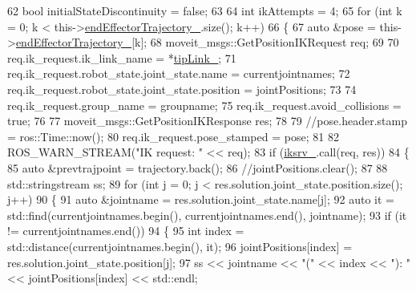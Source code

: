 \begin{DoxyCode}
62         \textcolor{keywordtype}{bool} initialStateDiscontinuity = \textcolor{keyword}{false};
63 
64         \textcolor{keywordtype}{int} ikAttempts = 4;
65         \textcolor{keywordflow}{for} (\textcolor{keywordtype}{int} k = 0; k < this->\hyperlink{classcl__move__group__interface_1_1CbMoveEndEffectorTrajectory_ae13dfd31ea3660646e03882f0c2c29f0}{endEffectorTrajectory\_}.size(); k++)
66         \{
67             \textcolor{keyword}{auto} &pose = this->\hyperlink{classcl__move__group__interface_1_1CbMoveEndEffectorTrajectory_ae13dfd31ea3660646e03882f0c2c29f0}{endEffectorTrajectory\_}[k];
68             moveit\_msgs::GetPositionIKRequest req;
69 
70             req.ik\_request.ik\_link\_name = *\hyperlink{classcl__move__group__interface_1_1CbMoveEndEffectorTrajectory_a24c6c30b9b0761a61fa002d947bd3e11}{tipLink\_};
71             req.ik\_request.robot\_state.joint\_state.name = currentjointnames;
72             req.ik\_request.robot\_state.joint\_state.position = jointPositions;
73 
74             req.ik\_request.group\_name = groupname;
75             req.ik\_request.avoid\_collisions = \textcolor{keyword}{true};
76 
77             moveit\_msgs::GetPositionIKResponse res;
78 
79             \textcolor{comment}{//pose.header.stamp = ros::Time::now();}
80             req.ik\_request.pose\_stamped = pose;
81 
82             ROS\_WARN\_STREAM(\textcolor{stringliteral}{"IK request: "} << req);
83             \textcolor{keywordflow}{if} (\hyperlink{classcl__move__group__interface_1_1CbMoveEndEffectorTrajectory_a8a2e2225a5b53325241e45e4e28fa3a7}{iksrv\_}.call(req, res))
84             \{
85                 \textcolor{keyword}{auto} &prevtrajpoint = trajectory.back();
86                 \textcolor{comment}{//jointPositions.clear();}
87 
88                 std::stringstream ss;
89                 \textcolor{keywordflow}{for} (\textcolor{keywordtype}{int} j = 0; j < res.solution.joint\_state.position.size(); j++)
90                 \{
91                     \textcolor{keyword}{auto} &jointname = res.solution.joint\_state.name[j];
92                     \textcolor{keyword}{auto} it = std::find(currentjointnames.begin(), currentjointnames.end(), jointname);
93                     \textcolor{keywordflow}{if} (it != currentjointnames.end())
94                     \{
95                         \textcolor{keywordtype}{int} index = std::distance(currentjointnames.begin(), it);
96                         jointPositions[index] = res.solution.joint\_state.position[j];
97                         ss << jointname << \textcolor{stringliteral}{"("} << index << \textcolor{stringliteral}{"): "} << jointPositions[index] << std::endl;

\end{DoxyCode}
